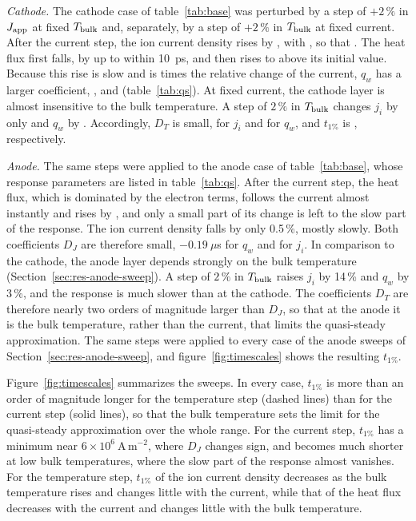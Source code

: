 \emph{Cathode.} The cathode case of table~\ref{tab:base} was perturbed by a step of \(+2\,\%\) in \(J_{\rm app}\) at fixed \(T_{\rm bulk}\) and, separately, by a step of \(+2\,\%\) in \(T_{\rm bulk}\) at fixed current. After the current step, the ion current density rises by , with , so that . The heat flux first falls, by up to  within 10~ps, and then rises to  above its initial value. Because this rise is slow and is  times the relative change of the current, \(q_w\) has a larger coefficient, , and  (table~\ref{tab:qs}). At fixed current, the cathode layer is almost insensitive to the bulk temperature. A step of \(2\,\%\) in \(T_{\rm bulk}\) changes \(j_i\) by only  and \(q_w\) by . Accordingly, \(D_T\) is small,  for \(j_i\) and  for \(q_w\), and \(t_{1\%}\) is , respectively.

\emph{Anode.} The same steps were applied to the anode case of table~\ref{tab:base}, whose response parameters are listed in table~\ref{tab:qs}. After the current step, the heat flux, which is dominated by the electron terms, follows the current almost instantly and rises by , and only a small part of its change is left to the slow part of the response. The ion current density falls by only 0.5\,\%, mostly slowly. Both coefficients \(D_J\) are therefore small, \(-0.19\ \mu\)s for \(q_w\) and  for \(j_i\). In comparison to the cathode, the anode layer depends strongly on the bulk temperature (Section~\ref{sec:res-anode-sweep}). A step of \(2\,\%\) in \(T_{\rm bulk}\) raises \(j_i\) by 14\,\% and \(q_w\) by 3\,\%, and the response is much slower than at the cathode. The coefficients \(D_T\) are therefore nearly two orders of magnitude larger than \(D_J\), so that at the anode it is the bulk temperature, rather than the current, that limits the quasi-steady approximation. The same steps were applied to every case of the anode sweeps of Section~\ref{sec:res-anode-sweep}, and figure~\ref{fig:timescales} shows the resulting \(t_{1\%}\).


Figure~\ref{fig:timescales} summarizes the sweeps. In every case, \(t_{1\%}\) is more than an order of magnitude longer for the temperature step (dashed lines) than for the current step (solid lines), so that the bulk temperature sets the limit for the quasi-steady approximation over the whole range. For the current step, \(t_{1\%}\) has a minimum near \(6\times10^{6}\ \mathrm{A\,m^{-2}}\), where \(D_J\) changes sign, and becomes much shorter at low bulk temperatures, where the slow part of the response almost vanishes. For the temperature step, \(t_{1\%}\) of the ion current density decreases as the bulk temperature rises and changes little with the current, while that of the heat flux decreases with the current and changes little with the bulk temperature.

